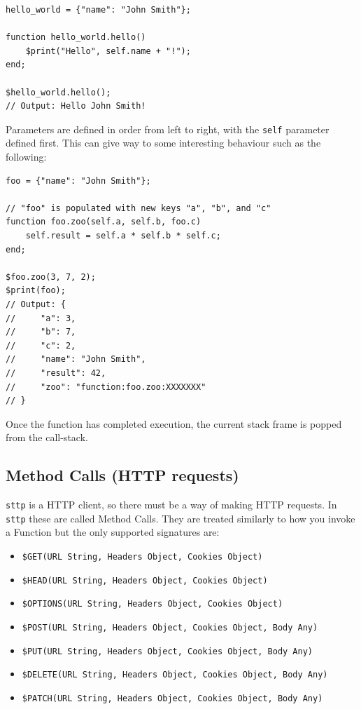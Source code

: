 \documentclass[]{full}
\theoremstyle{definition}
\begin{document}
\begin{verbatim}
hello_world = {"name": "John Smith"};

function hello_world.hello()
    $print("Hello", self.name + "!");
end;

$hello_world.hello();
// Output: Hello John Smith!
\end{verbatim}

Parameters are defined in order from left to right, with the \verb|self| parameter defined first. This can give way to some interesting behaviour such as the following:

\begin{verbatim}
foo = {"name": "John Smith"};

// "foo" is populated with new keys "a", "b", and "c"
function foo.zoo(self.a, self.b, foo.c)
    self.result = self.a * self.b * self.c;
end;

$foo.zoo(3, 7, 2);
$print(foo);
// Output: {
//     "a": 3,
//     "b": 7,
//     "c": 2,
//     "name": "John Smith",
//     "result": 42,
//     "zoo": "function:foo.zoo:XXXXXXX"
// }
\end{verbatim}

Once the function has completed execution, the current stack frame is popped from the call-stack.

\subsection{Method Calls (HTTP requests)}

\verb|sttp| is a HTTP client, so there must be a way of making HTTP requests. In \verb|sttp| these are called Method Calls. They are treated similarly to how you invoke a Function but the only supported signatures are:

\begin{itemize}
    \item \verb|$GET(URL String, Headers Object, Cookies Object)|
    \item \verb|$HEAD(URL String, Headers Object, Cookies Object)|
    \item \verb|$OPTIONS(URL String, Headers Object, Cookies Object)|
    \item \verb|$POST(URL String, Headers Object, Cookies Object, Body Any)|
    \item \verb|$PUT(URL String, Headers Object, Cookies Object, Body Any)|
    \item \verb|$DELETE(URL String, Headers Object, Cookies Object, Body Any)|
    \item \verb|$PATCH(URL String, Headers Object, Cookies Object, Body Any)|
\end{itemize}
\end{document}
